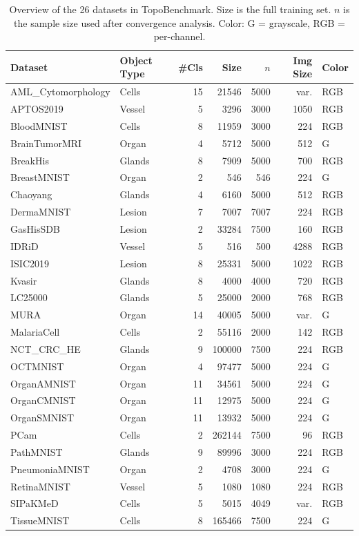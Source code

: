 \begin{table}[h]
\centering
\caption{Overview of the 26 datasets in TopoBenchmark. Size is the full training set. $n$ is the sample size used after convergence analysis. Color: G = grayscale, RGB = per-channel.}
\label{tab:datasets}
\small
\begin{tabular}{llrrrrl}
\toprule
Dataset & Object Type & \#Cls & Size & $n$ & Img Size & Color \\
\midrule
AML\_Cytomorphology & Cells & 15 & 21546 & 5000 & var. & RGB \\
APTOS2019 & Vessel & 5 & 3296 & 3000 & 1050 & RGB \\
BloodMNIST & Cells & 8 & 11959 & 3000 & 224 & RGB \\
BrainTumorMRI & Organ & 4 & 5712 & 5000 & 512 & G \\
BreakHis & Glands & 8 & 7909 & 5000 & 700 & RGB \\
BreastMNIST & Organ & 2 & 546 & 546 & 224 & G \\
Chaoyang & Glands & 4 & 6160 & 5000 & 512 & RGB \\
DermaMNIST & Lesion & 7 & 7007 & 7007 & 224 & RGB \\
GasHisSDB & Lesion & 2 & 33284 & 7500 & 160 & RGB \\
IDRiD & Vessel & 5 & 516 & 500 & 4288 & RGB \\
ISIC2019 & Lesion & 8 & 25331 & 5000 & 1022 & RGB \\
Kvasir & Glands & 8 & 4000 & 4000 & 720 & RGB \\
LC25000 & Glands & 5 & 25000 & 2000 & 768 & RGB \\
MURA & Organ & 14 & 40005 & 5000 & var. & G \\
MalariaCell & Cells & 2 & 55116 & 2000 & 142 & RGB \\
NCT\_CRC\_HE & Glands & 9 & 100000 & 7500 & 224 & RGB \\
OCTMNIST & Organ & 4 & 97477 & 5000 & 224 & G \\
OrganAMNIST & Organ & 11 & 34561 & 5000 & 224 & G \\
OrganCMNIST & Organ & 11 & 12975 & 5000 & 224 & G \\
OrganSMNIST & Organ & 11 & 13932 & 5000 & 224 & G \\
PCam & Cells & 2 & 262144 & 7500 & 96 & RGB \\
PathMNIST & Glands & 9 & 89996 & 3000 & 224 & RGB \\
PneumoniaMNIST & Organ & 2 & 4708 & 3000 & 224 & G \\
RetinaMNIST & Vessel & 5 & 1080 & 1080 & 224 & RGB \\
SIPaKMeD & Cells & 5 & 5015 & 4049 & var. & RGB \\
TissueMNIST & Cells & 8 & 165466 & 7500 & 224 & G \\
\bottomrule
\end{tabular}
\end{table}

